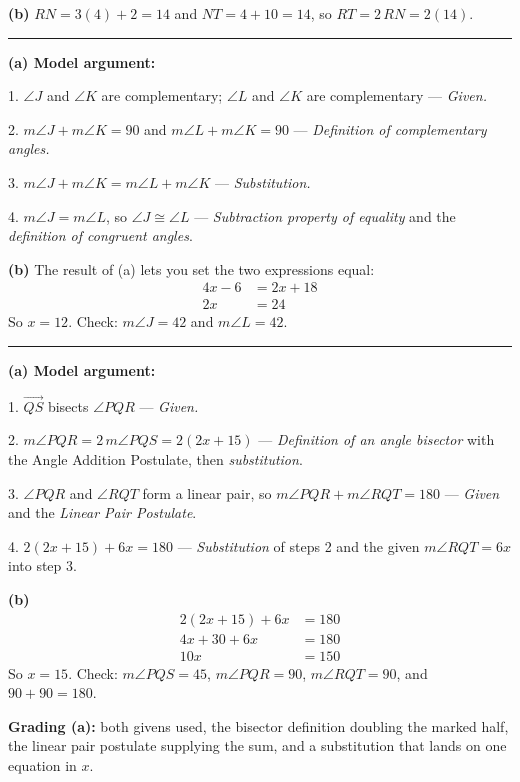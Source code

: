 \documentclass[12pt]{article}
\begin{document}
\textbf{(b)} $RN = 3(4) + 2 = 14$ and $NT = 4 + 10 = 14$, so $RT = 2\,RN = 2(14)$. 

\vspace{0.2cm}\noindent\rule{\linewidth}{0.2pt}


\textbf{(a) Model argument:}

1. $\angle J$ and $\angle K$ are complementary; $\angle L$ and $\angle K$ are complementary --- \emph{Given.}

2. $m\angle J + m\angle K = 90$ and $m\angle L + m\angle K = 90$ --- \emph{Definition of complementary angles.}

3. $m\angle J + m\angle K = m\angle L + m\angle K$ --- \emph{Substitution.}

4. $m\angle J = m\angle L$, so $\angle J \cong \angle L$ --- \emph{Subtraction property of equality} and the \emph{definition of congruent angles}.

\textbf{(b)} The result of (a) lets you set the two expressions equal:
\begin{align*}
  4x - 6 &= 2x + 18 \\
  2x &= 24
\end{align*}
So $x = 12$. Check: $m\angle J = 42$ and $m\angle L = 42$. 

\vspace{0.2cm}\noindent\rule{\linewidth}{0.2pt}


\textbf{(a) Model argument:}

1. $\overrightarrow{QS}$ bisects $\angle PQR$ --- \emph{Given.}

2. $m\angle PQR = 2\,m\angle PQS = 2(2x + 15)$ --- \emph{Definition of an angle bisector} with the Angle Addition Postulate, then \emph{substitution}.

3. $\angle PQR$ and $\angle RQT$ form a linear pair, so $m\angle PQR + m\angle RQT = 180$ --- \emph{Given} and the \emph{Linear Pair Postulate}.

4. $2(2x + 15) + 6x = 180$ --- \emph{Substitution} of steps 2 and the given $m\angle RQT = 6x$ into step 3.

\textbf{(b)}
\begin{align*}
  2(2x + 15) + 6x &= 180 \\
  4x + 30 + 6x &= 180 \\
  10x &= 150
\end{align*}
So $x = 15$. Check: $m\angle PQS = 45$, $m\angle PQR = 90$, $m\angle RQT = 90$, and $90 + 90 = 180$. 

\textbf{Grading (a):} both givens used, the bisector definition doubling the marked half, the linear pair postulate supplying the sum, and a substitution that lands on one equation in $x$.
\end{document}

